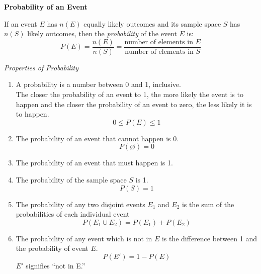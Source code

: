 \begin{center}
\textbf{Probability of an Event}
\end{center}

\vspace*{1ex}

If an event $E$ has $n(E)$ equally likely outcomes and its sample space $S$ has $n(S)$ likely outcomes, then the \emph{probability} of the event $E$ is: 
\[
P(E) = \displaystyle \frac{n(E) }{n(S)} = \displaystyle \frac{\text{number of elements in } E}{\text{number of elements in }S} 
\] 

\vspace*{1.5ex}

\emph{Properties of Probability} 
\begin{enumerate}[label = \arabic*. ]
\item A probability is a number between 0 and 1, inclusive. \\
The closer the probability of an event to 1, the more likely the event is to happen and the closer the probability of an event to zero, the less likely it is to happen. \\
$$0 \leq P(E) \leq 1$$
\item The probability of an event that cannot happen is 0.
$$ P(\varnothing) = 0$$
\item The probability of an event that must happen is 1.
\item The probability of the sample space $S$ is 1.
$$P(S) =1$$

\item The probability of any two disjoint events $E_1$ and $E_2$ is the sum of the probabilities of each individual event
$$P(E_1 \cup E_2) = P(E_1) + P(E_2)$$

\item The probability of any event which is not in $E$ is the difference between 1 and the probability of event $E$. 
$$P(E') = 1 - P(E)$$
$E'$ signifies ``not in E.''

\end{enumerate} 


